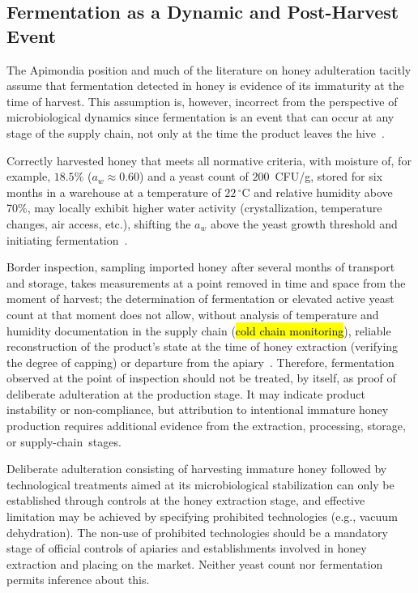 \documentclass[foods,review,accept,pdftex,moreauthors]{Definitions/mdpi}
\begin{document}
{\subsection{Fermentation as a Dynamic and Post-Harvest Event}


The Apimondia position and much of the literature on honey
adulteration tacitly assume that fermentation detected in honey
is evidence of its immaturity at the time of harvest.
This assumption is, however, incorrect from the perspective of
microbiological dynamics since fermentation is an event that can
occur at any stage of the supply chain, not only at the time
the product leaves the hive~\cite{apinz2021,analytica2020}.

Correctly harvested honey that meets all normative criteria,
with moisture of, for example, $18.5\%$ ($a_w \approx 0.60$)
and a yeast count of $200$~CFU/g, stored for six months in a
warehouse at a temperature of $22\,^\circ$C and relative humidity
above 70\%, may locally exhibit higher water activity
(crystallization, temperature changes, air access, etc.), shifting
the $a_w$ above the yeast growth threshold and initiating
fermentation~\cite{apinz2021}.

Border inspection, sampling imported honey after several months
of transport and storage, takes measurements at a point removed
in time and space from the moment of harvest; the determination of
fermentation or elevated active yeast count at that moment does not
allow, without analysis of temperature and humidity documentation
in the supply chain (\hl{cold chain monitoring}), reliable
reconstruction of the product's state at the time of honey
extraction (verifying the degree of capping) or departure from
the apiary~\cite{tsagkaris2021,schoder2026}.
Therefore, fermentation observed at the point of inspection should not be treated, by itself, as proof of deliberate adulteration at the production stage. It may indicate product instability or non-compliance, but attribution to intentional immature honey production requires additional evidence from the extraction, processing, storage, or \mbox{supply-chain stages.}

Deliberate adulteration consisting of
harvesting immature honey followed by technological treatments
aimed at its microbiological stabilization can only be established
through controls at the honey extraction stage, and effective
limitation may be achieved by specifying prohibited technologies
(e.g., vacuum dehydration). The non-use of prohibited technologies
should be a mandatory stage of official controls of apiaries and
establishments involved in honey extraction and placing on the
market. Neither yeast count nor fermentation permits inference
about this.


}
\end{document}
